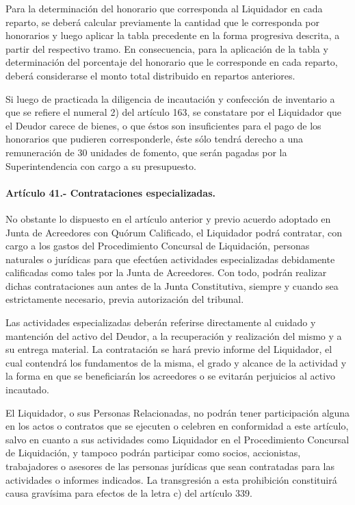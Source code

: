 \documentclass[
]{book}
\begin{document}
Para la determinación del honorario que corresponda al Liquidador en cada reparto, se deberá calcular previamente la cantidad que le corresponda por honorarios y luego aplicar la tabla precedente en la forma progresiva descrita, a partir del respectivo tramo. En consecuencia, para la aplicación de la tabla y determinación del porcentaje del honorario que le corresponde en cada reparto, deberá considerarse el monto total distribuido en repartos anteriores.

Si luego de practicada la diligencia de incautación y confección de inventario a que se refiere el numeral 2) del artículo 163, se constatare por el Liquidador que el Deudor carece de bienes, o que éstos son insuficientes para el pago de los honorarios que pudieren corresponderle, éste sólo tendrá derecho a una remuneración de 30 unidades de fomento, que serán pagadas por la Superintendencia con cargo a su presupuesto.

\hypertarget{artuxedculo-41.--contrataciones-especializadas.}{%
\paragraph*{Artículo 41.- Contrataciones especializadas.}\label{artuxedculo-41.--contrataciones-especializadas.}}

No obstante lo dispuesto en el artículo anterior y previo acuerdo adoptado en Junta de Acreedores con Quórum Calificado, el Liquidador podrá contratar, con cargo a los gastos del Procedimiento Concursal de Liquidación, personas naturales o jurídicas para que efectúen actividades especializadas debidamente calificadas como tales por la Junta de Acreedores.
Con todo, podrán realizar dichas contrataciones aun antes de la Junta Constitutiva, siempre y cuando sea estrictamente necesario, previa autorización del tribunal.

Las actividades especializadas deberán referirse directamente al cuidado y mantención del activo del Deudor, a la recuperación y realización del mismo y a su entrega material. La contratación se hará previo informe del Liquidador, el cual contendrá los fundamentos de la misma, el grado y alcance de la actividad y la forma en que se beneficiarán los acreedores o se evitarán perjuicios al activo incautado.

El Liquidador, o sus Personas Relacionadas, no podrán tener participación alguna en los actos o contratos que se ejecuten o celebren en conformidad a este artículo, salvo en cuanto a sus actividades como Liquidador en el Procedimiento Concursal de Liquidación, y tampoco podrán participar como socios, accionistas, trabajadores o asesores de las personas jurídicas que sean contratadas para las actividades o informes indicados. La transgresión a esta prohibición constituirá causa gravísima para efectos de la letra c) del artículo 339.
\end{document}
